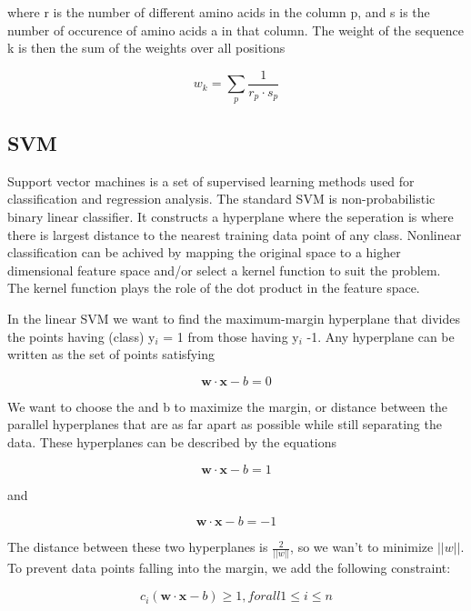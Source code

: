 where r is the number of different amino acids in the column p, and s is the number of occurence of amino acids a in that column. The weight of the sequence k is then the sum of the weights over all positions

\begin{equation}
w_{k} = \sum_{p}{\frac{1}{r_p \cdot s_p}}
\end{equation}

\subsection*{SVM}
Support vector machines is a set of supervised learning methods used for classification and regression analysis. 
The standard SVM is non-probabilistic binary linear classifier. 
It constructs a hyperplane where the seperation is where there is largest distance to the nearest training data point of any class. 
Nonlinear classification can be achived by  mapping the original space to a higher dimensional feature space and/or select a kernel function to suit the problem. 
The kernel function plays the role of the dot product in the feature space.

In the linear SVM we want to find the maximum-margin hyperplane that divides the points having (class) y$_{i}$ = 1 from those having y$_i$  -1. Any hyperplane can be written as the set of points satisfying

\begin{equation}
\mathbf{w \cdot x} - b = 0
\end{equation}

We want to choose the  and b to maximize the margin, or distance between the parallel hyperplanes that are as far apart as possible while still separating the data. These hyperplanes can be described by the equations

\begin{equation}
\mathbf{w \cdot x} - b = 1
\end{equation}

and

\begin{equation}
\mathbf{w \cdot x} - b = -1
\end{equation}

The distance between these two hyperplanes is $\frac{2}{||w||}$, so we wan't to minimize $||w||$.
To prevent data points falling into the margin, we add the following constraint:

\begin{equation}
c_i(\mathbf{w \cdot x} - b) \geq 1, for all 1 \leq i \leq n
\end{equation}

